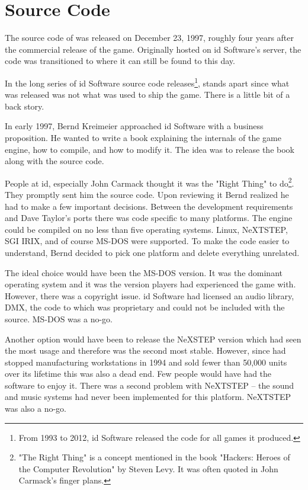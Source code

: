 \section{Source Code}
The source code of \doom{} was released on December 23, 1997, roughly four years after the commercial release of the game. Originally hosted on id Software's  server, the code was transitioned to  where it can still be found to this day.\\
\par
{}
\par
 In the long series of id Software source code releases\footnote{From 1993 to 2012, id Software released the code for all games it produced.}, \doom{} stands apart since what was released was not what was used to ship the game. There is a little bit of a back story.\\
 \par
 In early 1997, Bernd Kreimeier approached id Software with a business proposition. He wanted to write a book explaining the internals of the game engine, how to compile, and how to modify it. The idea was to release the book along with the source code.\\
 \par
  People at id, especially John Carmack thought it was the "Right Thing" to do\footnote{"The Right Thing" is a concept mentioned in the book "Hackers: Heroes of the Computer Revolution" by Steven Levy. It was often quoted in John Carmack's finger plans.}. They promptly sent him the source code. Upon reviewing it Bernd realized he had to make a few important decisions. Between the development requirements and Dave Taylor's ports there was code specific to many platforms. The engine could be compiled on no less than five operating systems. Linux, NeXTSTEP, SGI IRIX, and of course MS-DOS were supported. To make the code easier to understand, Bernd decided to pick one platform and delete everything unrelated.\\
  \par
  The ideal choice would have been the MS-DOS version. It was the dominant operating system and it was the version players had experienced the game with. However, there was a copyright issue. id Software had licensed an audio library, DMX, the code to which was proprietary and could not be included with the source. MS-DOS was a no-go.\\
  \par
   Another option would have been to release the NeXSTEP version which had seen the most usage and therefore was the second most stable. However, since \NeXT had stopped manufacturing workstations in 1994 and sold fewer than 50,000 units over its lifetime this was also a dead end. Few people would have had the software to enjoy it. There was a second problem with NeXTSTEP -- the sound and music systems had never been implemented for this platform. NeXTSTEP was also a no-go.\\
   \par
   
